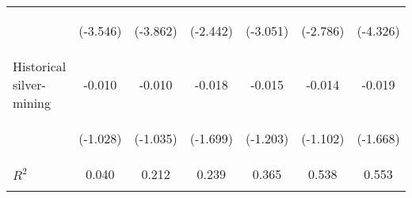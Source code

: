 \begin{center}
\begin{tabular}{lcccccc}
 & \begin{footnotesize}(-3.546)\end{footnotesize} & \begin{footnotesize}(-3.862)\end{footnotesize} & \begin{footnotesize}(-2.442)\end{footnotesize} & \begin{footnotesize}(-3.051)\end{footnotesize} & \begin{footnotesize}(-2.786)\end{footnotesize} & \begin{footnotesize}(-4.326)\end{footnotesize}\\
\noalign{\smallskip}Historical silver-mining & -0.010 & -0.010 & -0.018 & -0.015 & -0.014 & -0.019\\
 & \begin{footnotesize}(-1.028)\end{footnotesize} & \begin{footnotesize}(-1.035)\end{footnotesize} & \begin{footnotesize}(-1.699)\end{footnotesize} & \begin{footnotesize}(-1.203)\end{footnotesize} & \begin{footnotesize}(-1.102)\end{footnotesize} & \begin{footnotesize}(-1.668)\end{footnotesize}\\
\noalign{\smallskip}$ R^2$ & 0.040 & 0.212 & 0.239 & 0.365 & 0.538 & 0.553\\
 & \begin{footnotesize}\end{footnotesize} & \begin{footnotesize}\end{footnotesize} & \begin{footnotesize}\end{footnotesize} & \begin{footnotesize}\end{footnotesize} & \begin{footnotesize}\end{footnotesize} & \begin{footnotesize}\end{footnotesize}\\

\end{tabular}
\end{center}
